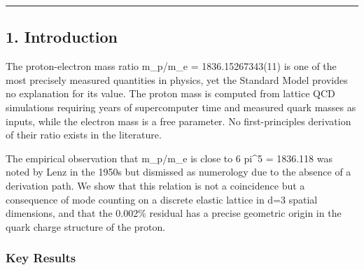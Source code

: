 \documentclass[
]{article}
\begin{document}
\begin{center}\rule{0.5\linewidth}{0.5pt}\end{center}

\subsection{1. Introduction}\label{introduction}

The proton-electron mass ratio m\_p/m\_e = 1836.15267343(11) is one of
the most precisely measured quantities in physics, yet the Standard
Model provides no explanation for its value. The proton mass is computed
from lattice QCD simulations requiring years of supercomputer time and
measured quark masses as inputs, while the electron mass is a free
parameter. No first-principles derivation of their ratio exists in the
literature.

The empirical observation that m\_p/m\_e is close to 6 pi\^{}5 =
1836.118 was noted by Lenz in the 1950s but dismissed as numerology due
to the absence of a derivation path. We show that this relation is not a
coincidence but a consequence of mode counting on a discrete elastic
lattice in d=3 spatial dimensions, and that the 0.002\% residual has a
precise geometric origin in the quark charge structure of the proton.

\subsubsection{Key Results}\label{key-results}
\end{document}

